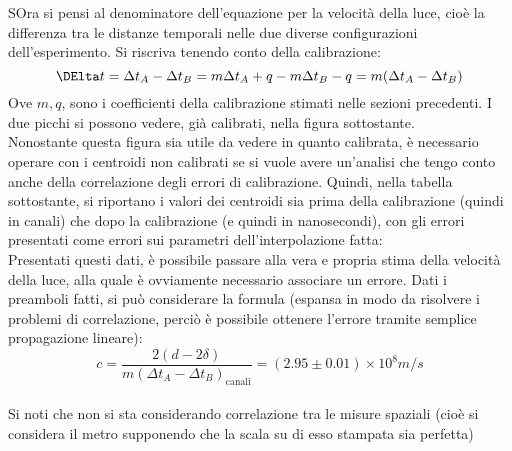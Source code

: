 SOra si pensi al denominatore dell'equazione per la velocità della luce, cioè la differenza tra le distanze temporali nelle due diverse configurazioni dell'esperimento.
Si riscriva tenendo conto della calibrazione:
$$
  \DElta t = \Delta t_A - \Delta t_B = m\Delta t_A + q - m\Delta t_B - q = m (\Delta t_A - \Delta t_B) 
$$
Ove $m,q$, sono i coefficienti della calibrazione stimati nelle sezioni precedenti. I due picchi si possono vedere, già calibrati, nella figura sottostante.\\

Nonostante questa figura sia utile da vedere in quanto calibrata, è necessario operare con i centroidi non calibrati se si vuole avere un'analisi che tengo conto anche
della correlazione degli errori di calibrazione. Quindi, nella tabella sottostante, si riportano i valori dei centroidi sia prima della calibrazione (quindi in canali)
che dopo la calibrazione (e quindi in nanosecondi), con gli errori presentati come errori sui parametri dell'interpolazione fatta:
\\

Presentati questi dati, è possibile passare alla vera e propria stima della velocità della luce, alla quale è ovviamente necessario associare un errore. Dati i preamboli
fatti, si può considerare la formula (espansa in modo da risolvere i problemi di correlazione, perciò è possibile ottenere l'errore tramite semplice propagazione
lineare):
$$
  c = \frac{2 ( d - 2 \delta)}{m (\Delta t_A - \Delta t_B)_\text{canali}} = (2.95 \pm 0.01) \times 10^8 m/s 
$$
\\

Si noti che non si sta considerando correlazione tra le misure spaziali (cioè si considera il metro supponendo che la scala su di esso stampata sia perfetta)

